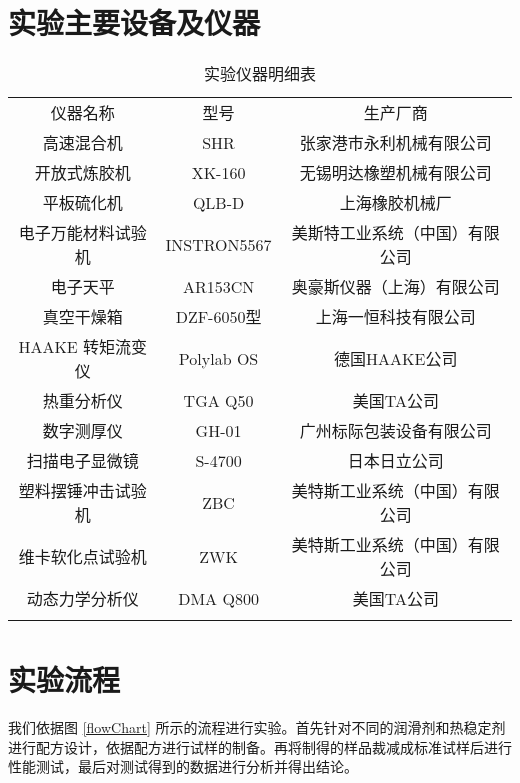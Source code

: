 \section{实验主要设备及仪器}

\begin{table}[H]
	\caption{实验仪器明细表}
	\label{tabEqu}
	\begin{center}
		\begin{tabular}{ccc}
				\borderLine
				仪器名称 & 型号 & 生产厂商		\\
				\interLine
				高速混合机 & SHR & 张家港市永利机械有限公司	\\
				开放式炼胶机 & XK-160 & 无锡明达橡塑机械有限公司	\\
				平板硫化机 & QLB-D & 上海橡胶机械厂	\\
				电子万能材料试验机 & INSTRON5567 & 美斯特工业系统（中国）有限公司	\\
				电子天平 & AR153CN & 奥豪斯仪器（上海）有限公司	\\
				真空干燥箱 & DZF-6050型 & 上海一恒科技有限公司	\\
				HAAKE 转矩流变仪 & Polylab OS & 德国HAAKE公司	\\
				热重分析仪 & TGA Q50 & 美国TA公司	\\
				数字测厚仪 & GH-01 & 广州标际包装设备有限公司	\\
				扫描电子显微镜 & S-4700 & 日本日立公司	\\
				塑料摆锤冲击试验机 & ZBC & 美特斯工业系统（中国）有限公司	\\
				维卡软化点试验机 & ZWK & 美特斯工业系统（中国）有限公司	\\
				动态力学分析仪 & DMA Q800 & 美国TA公司	\\
				\borderLine
		\end{tabular}
	\end{center}
\end{table}

\section{实验流程}

我们依据图 \ref{flowChart} 所示的流程进行实验。首先针对不同的润滑剂和热稳定剂进行配方设计，依据配方进行试样的制备。再将制得的样品裁减成标准试样后进行性能测试，最后对测试得到的数据进行分析并得出结论。

